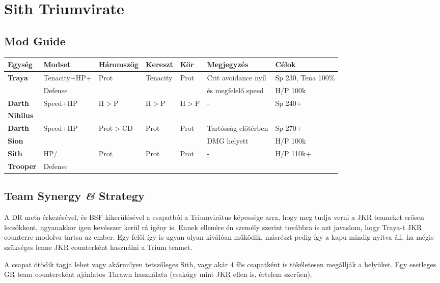 \documentclass[11pt]{report}
\begin{document}
\chapter{Sith Triumvirate}
\section{Mod Guide}
\begin{center}
    \begin{tabular}{|l | l | l | l | l | l | l |}
        \hline
        Egység & Modset & Háromszög & Kereszt & Kör & Megjegyzés & Célok\\ \hline
        \textbf{Traya} & Tenacity+HP+ & Prot & Tenacity & Prot & Crit avoidance nyíl & Sp 230, Tena 100\%\\
        & Defense &  &  &  & és megfelelő speed & H/P 100k \\ \hline
        \textbf{Darth} & Speed+HP & H$>$P & H$>$P & H$>$P & - & Sp 240+\\
        \textbf{Nihilus} &  &  &  &  &  & \\ \hline
        \textbf{Darth} & Speed+HP & Prot$>$CD & Prot & Prot & Tartósság előtérben & Sp 270+\\
        \textbf{Sion} &  &  &  &  & DMG helyett & H/P 100k\\ \hline
        \textbf{Sith} & HP/ & Prot & Prot & Prot & - & H/P 110k+\\
        \textbf{Trooper} & Defense &  &  &  &  & \\ \hline              
    \end{tabular}
\end{center}
\section{Team Synergy \textit{\&} Strategy}
A DR meta érkezésével, és BSF kikerülésével a csapatból a Triumvirátus képessége arra, hogy meg tudja verni a JKR teameket erősen lecsökkent, ugyanakkor igen kevésszer kerül rá igény is. Ennek ellenére én személy szerint továbbra is azt javaslom, hogy Traya-t JKR counterre modolva tartsa az ember. Egy felől így is ugyan olyan kiválóan működik, másrészt pedig így a kapu mindig nyitva áll, ha mégis szükséges lenne JKR counterként használni a Trium teamet.\par
A csapat ötödik tagja lehet vagy akármilyen tetszőleges Sith, vagy akár 4 fős csapatként is tökéletesen megállják a helyüket. Egy esetleges GR team countereként ajánlatos Thrawn használata (csakúgy mint JKR ellen is, értelem szerűen).
\end{document}
